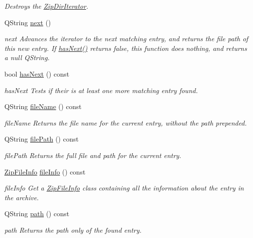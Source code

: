 \begin{DoxyCompactItemize}
\begin{DoxyCompactList}\small\item\em Destroys the \hyperlink{class_zip_dir_iterator}{Zip\+Dir\+Iterator}. \end{DoxyCompactList}\item 
Q\+String \hyperlink{class_zip_dir_iterator_adbe5429c0aad92a78fee63cdd745cbfb}{next} ()
\begin{DoxyCompactList}\small\item\em next Advances the iterator to the next matching entry, and returns the file path of this new entry. If \hyperlink{class_zip_dir_iterator_a99154331b3ba3983727647db9d8be094}{has\+Next()} returns false, this function does nothing, and returns a null Q\+String. \end{DoxyCompactList}\item 
bool \hyperlink{class_zip_dir_iterator_a99154331b3ba3983727647db9d8be094}{has\+Next} () const 
\begin{DoxyCompactList}\small\item\em has\+Next Tests if their is at least one more matching entry found. \end{DoxyCompactList}\item 
Q\+String \hyperlink{class_zip_dir_iterator_a6fce99e90601b44e3484adaf464b3366}{file\+Name} () const 
\begin{DoxyCompactList}\small\item\em file\+Name Returns the file name for the current entry, without the path prepended. \end{DoxyCompactList}\item 
Q\+String \hyperlink{class_zip_dir_iterator_addce0eff9eb5849cf8bdaecb08f4549d}{file\+Path} () const 
\begin{DoxyCompactList}\small\item\em file\+Path Returns the full file and path for the current entry. \end{DoxyCompactList}\item 
\hyperlink{class_zip_file_info}{Zip\+File\+Info} \hyperlink{class_zip_dir_iterator_aac1012735e0eb5373e3d579066815231}{file\+Info} () const 
\begin{DoxyCompactList}\small\item\em file\+Info Get a \hyperlink{class_zip_file_info}{Zip\+File\+Info} class containing all the information about the entry in the archive. \end{DoxyCompactList}\item 
Q\+String \hyperlink{class_zip_dir_iterator_a696786be9be2b184e56fd78cf2688d4f}{path} () const 
\begin{DoxyCompactList}\small\item\em path Returns the path only of the found entry. \end{DoxyCompactList}\end{DoxyCompactItemize}
